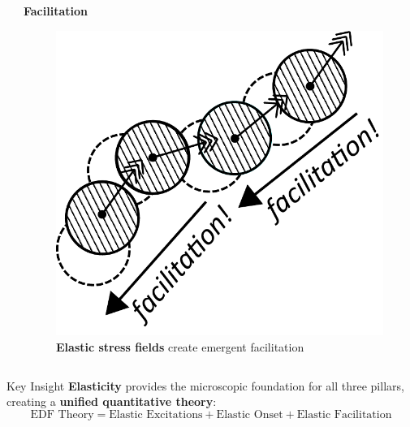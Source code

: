 \begin{frame}
\begin{columns}[T]
\begin{column}[T]{0.33\textwidth}
\end{column}

\begin{column}[T]{0.33\textwidth}

\centering\textbf{\Large Facilitation}

\begin{figure}[t]
\begin{center}
\centerline{\includegraphics[height=0.45\textheight]{a.2-intro_dftheory/facilitation_closer_2.pdf}}
\end{center}
\caption{\textbf{Elastic stress fields} create emergent facilitation}
\end{figure}

\end{column}
\end{columns}

\vspace{1em}

\begin{block}{\centering Key Insight}
\centering \textbf{Elasticity} provides the microscopic foundation for all three pillars, creating a \textbf{unified quantitative theory}: 
$$\boxed{\text{EDF Theory} = \text{Elastic Excitations} + \text{Elastic Onset} + \text{Elastic Facilitation}}$$
\end{block}

\end{frame} 